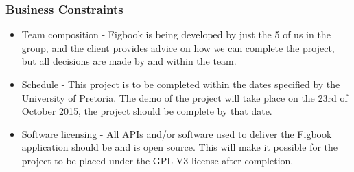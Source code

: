 \subsubsection{Business Constraints}
\begin{itemize}
\item Team composition - Figbook is being developed by just the 5 of us in the group, and the client provides advice on how we can complete the project, but all decisions are made by and within the team.
\item Schedule - This project is to be completed within the dates specified by the University of Pretoria. The demo of the project will take place on the 23rd of October 2015, the project should be complete by that date.
\item Software licensing - All APIs and/or software used to deliver the Figbook application should be and is open source. This will make it possible for the project to be placed under the GPL V3 license after completion.

\end{itemize}



